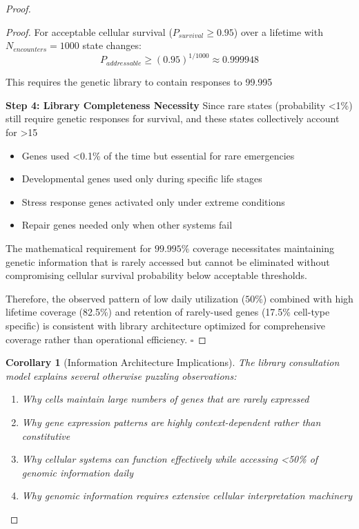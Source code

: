 \documentclass[12pt,a4paper]{article}
\newtheorem{corollary}[theorem]{Corollary}
\begin{document}
\begin{proof}
\begin{proof}
For acceptable cellular survival ($P_{survival} \geq 0.95$) over a lifetime with $N_{encounters} = 1000$ state changes:
\begin{equation}
P_{addressable} \geq (0.95)^{1/1000} \approx 0.999948
\end{equation}

This requires the genetic library to contain responses to 99.995%

\textbf{Step 4: Library Completeness Necessity}
Since rare states (probability <1\%) still require genetic responses for survival, and these states collectively account for >15%
\begin{itemize}
\item Genes used <0.1\% of the time but essential for rare emergencies
\item Developmental genes used only during specific life stages  
\item Stress response genes activated only under extreme conditions
\item Repair genes needed only when other systems fail
\end{itemize}

The mathematical requirement for $99.995\%$ coverage necessitates maintaining genetic information that is rarely accessed but cannot be eliminated without compromising cellular survival probability below acceptable thresholds.

Therefore, the observed pattern of low daily utilization ($50\%$) combined with high lifetime coverage (82.5\%) and retention of rarely-used genes (17.5\% cell-type specific) is consistent with library architecture optimized for comprehensive coverage rather than operational efficiency. $\square$
\end{proof}

\begin{corollary}[Information Architecture Implications]
The library consultation model explains several otherwise puzzling observations:
\begin{enumerate}
\item Why cells maintain large numbers of genes that are rarely expressed
\item Why gene expression patterns are highly context-dependent rather than constitutive
\item Why cellular systems can function effectively while accessing <50\% of genomic information daily
\item Why genomic information requires extensive cellular interpretation machinery
\end{enumerate}
\end{corollary}


\end{proof}
\end{document}
